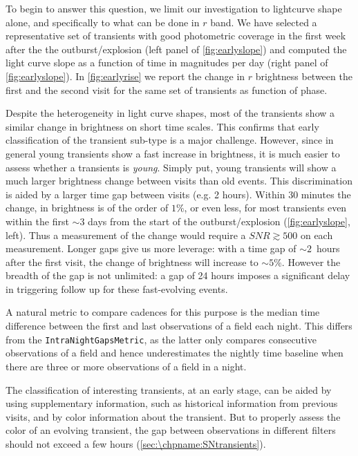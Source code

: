 To begin to answer this question, we limit our investigation to lightcurve shape alone, and specifically to what can be done in $r$ band. We have selected a representative set of transients with good photometric coverage in the first week after the the outburst/explosion (left panel of \autoref{fig:earlyslope}) and computed the light curve slope as a function of time in magnitudes per day (right panel of \autoref{fig:earlyslope}). In \autoref{fig:earlyrise} we report the change in $r$ brightness between the first and the second visit for the same set of transients as function of phase.

Despite the heterogeneity in light curve shapes, most of the transients show a similar change in brightness on short time scales. 
This confirms that early classification of the transient sub-type is a
major challenge. However, since in general young transients show a fast
increase in brightness, it is much easier to assess whether a transients is
\emph{young}.  Simply put, young transients will show a much larger
brightness change between visits than old events.
This discrimination is aided by a larger time gap between visits (e.g. 2 hours).
Within 30 minutes the change, in brightness is of the order of $1\%$, or
even less, for most transients even within the first $\sim3$ days from the
start of the outburst/explosion (\autoref{fig:earlyslope}, left). Thus a
measurement of the change would require a $SNR\gtrsim500$ on each
measurement. Longer gaps give us more leverage: with a time gap of
$\sim2$~hours after the first visit, the change of brightness will increase
to $\sim5\%$. However the breadth of the gap is not unlimited: a gap of 24
hours imposes a significant delay in triggering follow up for these
fast-evolving events.

A natural metric to compare cadences for this purpose 
is the median time difference between
the first and last observations of a field each night.  This differs from
the \texttt{IntraNightGapsMetric}, as the latter only compares consecutive
observations of a field and hence underestimates the nightly time baseline
when there are three or more observations of a field in a night.

The classification of interesting transients, at an early stage, can be
aided by using supplementary information, such as historical information
from previous visits, and by color information about the transient. But to
properly assess the color of an evolving transient, the
gap between observations in different filters should not exceed a few hours 
(\autoref{sec:\chpname:SNtransients}).

